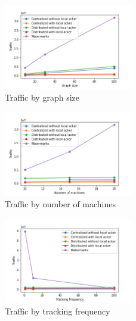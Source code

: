 \begin{figure}[htbp]
  \centering
  \includegraphics[width=0.50\textwidth]{traffic_by_graph_size.png}
  \caption{Traffic by graph size}
\end{figure}
\begin{figure}[htbp]
  \centering
  \includegraphics[width=0.50\textwidth]{traffic_by_number_of_machines.png}
  \caption{Traffic by number of machines}
\end{figure}
\begin{figure}[htbp]
  \centering
  \includegraphics[width=0.50\textwidth]{traffic_by_tracking_frequency.png}
  \caption{Traffic by tracking frequency}
\end{figure}

